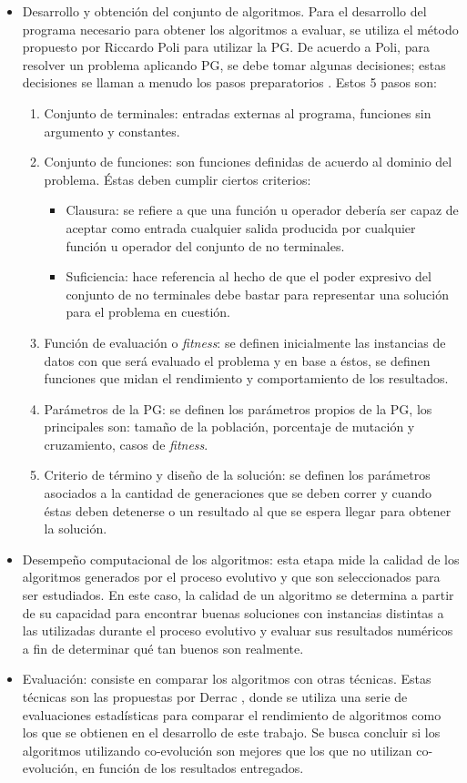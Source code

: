 \begin{itemize}
  \item Desarrollo y obtención del conjunto de algoritmos. Para el desarrollo del programa necesario para obtener los algoritmos a evaluar, se utiliza el método propuesto por Riccardo Poli para utilizar la PG. De acuerdo a Poli, para resolver un problema aplicando PG, se debe tomar algunas decisiones; estas decisiones se llaman a menudo los pasos preparatorios \citep{poli_2008}. Estos 5 pasos son:
  \begin{enumerate}
    \item Conjunto de terminales: entradas externas al programa, funciones sin argumento y constantes.
    \item Conjunto de funciones: son funciones definidas de acuerdo al dominio del problema. Éstas deben cumplir ciertos criterios:
    \begin{itemize}
      \item Clausura: se refiere a que una función u operador debería ser capaz de aceptar como entrada cualquier salida producida por cualquier función u operador del conjunto de no terminales.
      \item Suficiencia: hace referencia al hecho de que el poder expresivo del conjunto de no terminales debe bastar para representar una solución para el problema en cuestión. 
    \end{itemize}
    \item Función de evaluación o \textit{fitness}: se definen inicialmente las instancias de datos con que será evaluado el problema y en base a éstos, se definen funciones que midan el rendimiento y comportamiento de los resultados.
    \item Parámetros de la PG: se definen los parámetros propios de la PG, los principales son: tamaño de la población, porcentaje de mutación y cruzamiento, casos de \textit{fitness}.
    \item Criterio de término y diseño de la solución: se definen los parámetros asociados a la cantidad de generaciones que se deben correr y cuando éstas deben detenerse o un resultado al que se espera llegar para obtener la solución.
  \end{enumerate}
  \item Desempeño computacional de los algoritmos: esta etapa mide la calidad de los algoritmos generados por el proceso evolutivo y que son seleccionados para ser estudiados. En este caso, la calidad de un algoritmo se determina a partir de su capacidad para encontrar buenas soluciones con instancias distintas a las utilizadas durante el proceso evolutivo y evaluar sus resultados numéricos a fin de determinar qué tan buenos son realmente.
  \item Evaluación: consiste en comparar los algoritmos con otras técnicas. Estas técnicas son las propuestas por Derrac \citep{derrac_2011}, donde se utiliza una serie de evaluaciones estadísticas para comparar el rendimiento de algoritmos como los que se obtienen en el desarrollo de este trabajo. Se busca concluir si los algoritmos utilizando co-evolución son mejores que los que no utilizan co-evolución, en función de los resultados entregados.
\end{itemize}

